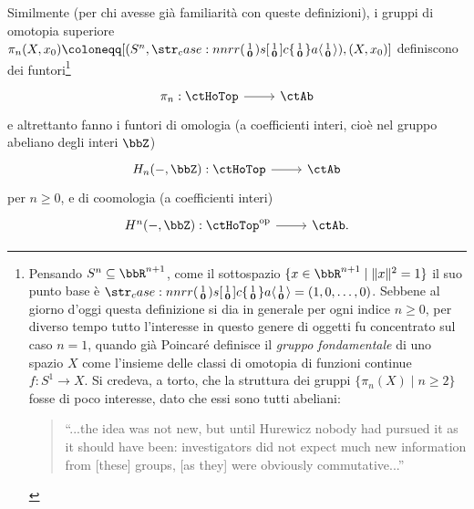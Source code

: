 \begin{example}
	Similmente (per chi avesse già familiarità con queste definizioni), i gruppi di omotopia superiore \(\pi_n(X,x_0) \defeq [(S^n,\copmap[r] 1{\mathbf{0}}), (X,x_0)]\) definiscono dei funtori\footnote{Pensando \(S^n\subseteq\bbR^{n+1}\), come il sottospazio \(\{x\in\bbR^{n+1}\mid \|x\|^2=1\}\) il suo punto base è \(\copmap[r]1{\mathbf 0}=(1,0,\dots,0)\). Sebbene al giorno d'oggi questa definizione si dia in generale per ogni indice \(n\ge 0\), per diverso tempo tutto l'interesse in questo genere di oggetti fu concentrato sul caso \(n=1\), quando già Poincaré definisce il \emph{gruppo fondamentale} di uno spazio \(X\) come l'insieme delle classi di omotopia di funzioni continue \(f : S^1 \to X\). Si credeva, a torto, che la struttura dei gruppi \(\{\pi_n(X)\mid n\ge 2\}\) fosse di poco interesse, dato che essi sono tutti abeliani:
	\begin{quote}
		``...the idea was not new, but until Hurewicz nobody had pursued it as it should have been: investigators did not expect much new information from  [these] groups, [as they] were obviously commutative...''
	\end{quote}}
	\[\dmFun{\pi_n}\ctHoTop\ctAb\]
	e altrettanto fanno i funtori di omologia (a coefficienti interi, cioè nel gruppo abeliano degli interi \(\bbZ\))
	\[\dmFun{H_n(-,\bbZ)}\ctHoTop\ctAb\]
	per \(n\ge 0\), e di coomologia (a coefficienti interi)
	\[\dmFun{H^n(-,\bbZ)}{\ctHoTop^\op}{\ctAb.}\]
\end{example}
